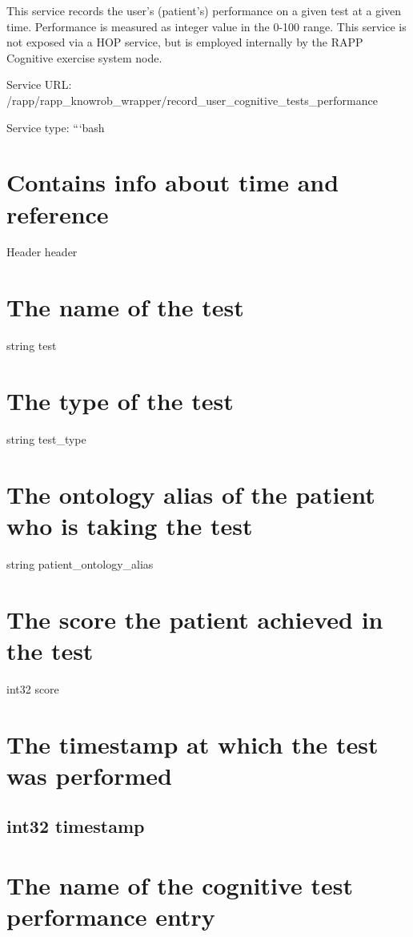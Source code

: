 This service records the user’s (patient’s) performance on a given test at a given time. Performance is measured as integer value in the 0-\/100 range. This service is not exposed via a H\-O\-P service, but is employed internally by the R\-A\-P\-P Cognitive exercise system node.

Service U\-R\-L\-: {\ttfamily /rapp/rapp\-\_\-knowrob\-\_\-wrapper/record\-\_\-user\-\_\-cognitive\-\_\-tests\-\_\-performance}

Service type\-: ```bash \section*{Contains info about time and reference}

Header header \section*{The name of the test}

string test \section*{The type of the test}

string test\-\_\-type \section*{The ontology alias of the patient who is taking the test}

string patient\-\_\-ontology\-\_\-alias \section*{The score the patient achieved in the test}

int32 score \section*{The timestamp at which the test was performed}

\subsection*{int32 timestamp }

\section*{The name of the cognitive test performance entry}

